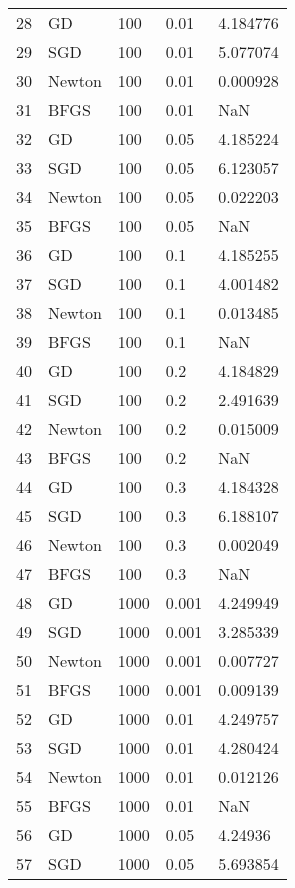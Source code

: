 \begin{tabular}{lllll}
28  &      GD &      100 &   0.01 &  4.184776 \\
29  &     SGD &      100 &   0.01 &  5.077074 \\
30  &  Newton &      100 &   0.01 &  0.000928 \\
31  &    BFGS &      100 &   0.01 &       NaN \\
32  &      GD &      100 &   0.05 &  4.185224 \\
33  &     SGD &      100 &   0.05 &  6.123057 \\
34  &  Newton &      100 &   0.05 &  0.022203 \\
35  &    BFGS &      100 &   0.05 &       NaN \\
36  &      GD &      100 &    0.1 &  4.185255 \\
37  &     SGD &      100 &    0.1 &  4.001482 \\
38  &  Newton &      100 &    0.1 &  0.013485 \\
39  &    BFGS &      100 &    0.1 &       NaN \\
40  &      GD &      100 &    0.2 &  4.184829 \\
41  &     SGD &      100 &    0.2 &  2.491639 \\
42  &  Newton &      100 &    0.2 &  0.015009 \\
43  &    BFGS &      100 &    0.2 &       NaN \\
44  &      GD &      100 &    0.3 &  4.184328 \\
45  &     SGD &      100 &    0.3 &  6.188107 \\
46  &  Newton &      100 &    0.3 &  0.002049 \\
47  &    BFGS &      100 &    0.3 &       NaN \\
48  &      GD &     1000 &  0.001 &  4.249949 \\
49  &     SGD &     1000 &  0.001 &  3.285339 \\
50  &  Newton &     1000 &  0.001 &  0.007727 \\
51  &    BFGS &     1000 &  0.001 &  0.009139 \\
52  &      GD &     1000 &   0.01 &  4.249757 \\
53  &     SGD &     1000 &   0.01 &  4.280424 \\
54  &  Newton &     1000 &   0.01 &  0.012126 \\
55  &    BFGS &     1000 &   0.01 &       NaN \\
56  &      GD &     1000 &   0.05 &   4.24936 \\
57  &     SGD &     1000 &   0.05 &  5.693854 \\

\end{tabular}
